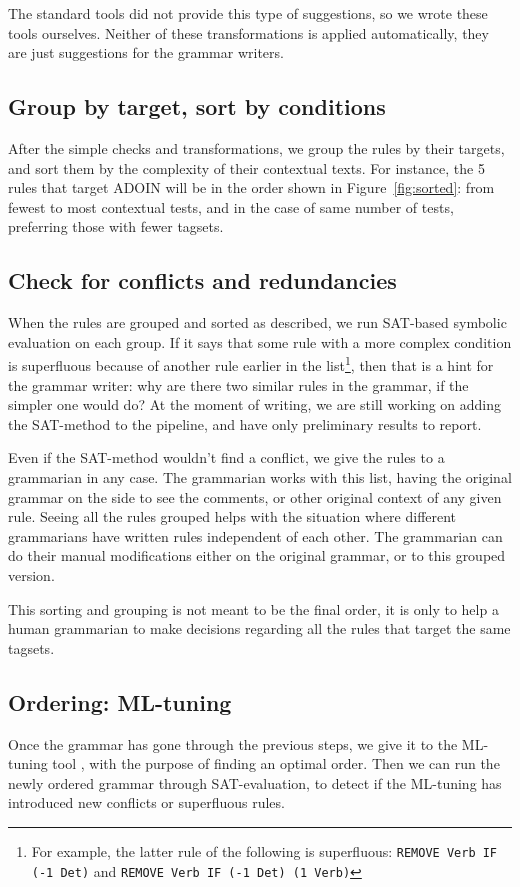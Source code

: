 \documentclass[11pt]{article}
\begin{document}
The standard tools did not provide this type of suggestions, so we wrote these tools ourselves. Neither of these transformations is applied automatically, they are just suggestions for the grammar writers.



\subsection{Group by target, sort by conditions}
After the simple checks and transformations, we group the rules by their targets, and sort them by the complexity of their contextual texts. For instance, the 5 rules that target ADOIN will be in the order shown in Figure~\ref{fig:sorted}: from fewest to most contextual tests, and in the case of same number of tests, preferring those with fewer tagsets.


\subsection{Check for conflicts and redundancies}

When the rules are grouped and sorted as described, we run SAT-based 
symbolic evaluation \cite{listenmaa_claessen2016} on each group. 
If it says that some rule with a more complex condition is superfluous 
because of another rule earlier in the list\footnote{For example, the latter rule of the following is superfluous: \texttt{REMOVE Verb IF (-1 Det)} and \texttt{REMOVE Verb IF (-1 Det) (1 Verb)}}, 
then that is a hint for the grammar writer: why are there two similar 
rules in the grammar, if the simpler one would do?
At the moment of writing, we are still working on adding
the SAT-method to the pipeline, and have only preliminary results to report.

Even if the SAT-method wouldn't find a conflict, we give the rules to 
a grammarian in any case. The grammarian works with this list, having 
the original grammar on the side to see the comments, or other original 
context of any given rule. Seeing all the rules grouped helps with the 
situation where different grammarians have written rules independent of 
each other. The grammarian can do their manual modifications either on 
the original grammar, or to this grouped version.

This sorting and grouping is not meant to be the final order, it is only 
to help a human grammarian to make decisions regarding all the rules that 
target the same tagsets.

\subsection{Ordering: ML-tuning}
Once the grammar has gone through the previous steps, we give it to the 
ML-tuning tool \cite{bick2013tuning}, with the purpose of finding an 
optimal order. Then we can run the newly ordered grammar through SAT-evaluation,
to detect if the ML-tuning has introduced new conflicts or superfluous rules.
\end{document}
